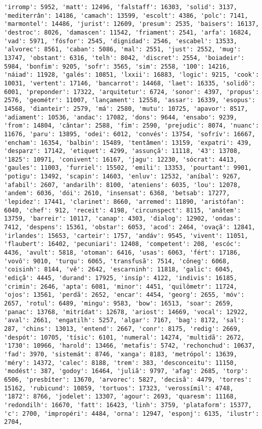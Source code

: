 \documentclass[11pt]{article}
\begin{document}
\begin{Verbatim}[commandchars=\\\{\}]
'irromp': 5952, 'matt': 12496, 'falstaff': 16303, 'solid': 3137, 'mediterrân': 14186, 'camach': 13599, 'escolt': 4386, 'polc': 7141, 'marmontel': 14486, 'jurist': 12609, 'presum': 2535, 'baisers': 16137, 'destroc': 8026, 'damascen': 11542, 'friament': 2541, 'arfa': 16824, 'vad': 5971, 'fósfor': 2545, 'dignidad': 2546, 'escabel': 13533, 'alvorec': 8561, 'caban': 5086, 'mal': 2551, 'just': 2552, 'mug': 13747, 'obstant': 6316, 'telh': 8042, 'discret': 2554, 'boiadeir': 5984, 'bonfim': 9205, 'sofr': 3565, 'sim': 2558, '100': 14216, 'náiad': 11928, 'galés': 10851, 'lxxii': 16883, 'logic': 9215, 'cook': 10031, 'vertent': 17146, 'bancarrot': 14468, 'laet': 16335, 'solidõ': 6001, 'preponder': 17322, 'arquitetur': 6724, 'sonor': 4397, 'propus': 2576, 'geométr': 11007, 'lançament': 12558, 'assar': 16339, 'esopus': 14568, 'dianteir': 2579, 'má': 2580, 'mutu': 10725, 'apavor': 8517, 'adiament': 10536, 'andac': 17082, 'dons': 9644, 'ensabo': 9239, 'from': 14804, 'cântar': 2588, 'fim': 2590, 'prejudic': 8074, 'nuanc': 11676, 'paru': 13895, 'odei': 6012, 'convés': 13754, 'sofrív': 16667, 'encham': 16354, 'balbin': 15489, 'tentâmen': 13159, 'expatri': 439, 'desparz': 17142, 'etiquet': 4299, 'assunçã': 11118, '43': 13708, '1825': 10971, 'conivent': 16167, 'jagu': 12230, 'sócrat': 4413, 'gaules': 11003, 'furriel': 15502, 'emili': 13353, 'pourtant': 9901, 'potigu': 13492, 'scapin': 14603, 'enluv': 12532, 'aníbal': 9267, 'afabil': 2607, 'andarilh': 8100, 'ateniens': 6035, 'lou': 12078, 'andem': 6036, 'dói': 2610, 'insensat': 6368, 'betsab': 17277, 'lepidez': 17441, 'clarinet': 8660, 'arremed': 11890, 'aristófan': 6040, 'chef': 912, 'receit': 4198, 'circunspect': 8115, 'anátem': 13759, 'barreir': 10117, 'canap': 4303, 'dialog': 12902, 'ondas': 7412, 'despens': 15361, 'obstar': 6053, 'acod': 2464, 'ovaçã': 12841, 'irlandes': 15653, 'carteir': 1757, 'andáv': 9545, 'vivent': 11051, 'flaubert': 16402, 'pecuniari': 12408, 'competent': 208, 'escóc': 4436, 'avult': 5818, 'otoman': 6416, 'usas': 6063, 'fért': 17186, 'vovô': 9010, 'turqu': 6065, 'transfusã': 7514, 'côneg': 6068, 'coisinh': 8144, 'vê': 2642, 'escarninh': 11818, 'galic': 6045, 'ediçã': 4445, 'durand': 17925, 'insíp': 4122, 'indivis': 16185, 'crimin': 2646, 'apta': 6081, 'minor': 4451, 'quilômetr': 11724, 'ojos': 13561, 'perdã': 2652, 'encar': 4454, 'georg': 2655, 'móv': 2657, 'rotul': 6489, 'mingu': 9583, 'bow': 16513, 'soar': 2659, 'panac': 13768, 'mitrídat': 12678, 'ariost': 14669, 'vocal': 12922, 'aval': 2661, 'engatilh': 5257, 'algar': 7167, 'bag': 8172, 'sal': 287, 'chins': 13013, 'entend': 2667, 'conr': 8175, 'redig': 2669, 'despót': 10705, 'tísic': 6101, 'numeral': 14274, 'multidã': 2672, '1730': 10966, 'harold': 13466, 'metafis': 5742, 'rechonchud': 10637, 'fad': 3970, 'sistemát': 8746, 'xanga': 8183, 'metrópol': 13639, 'méry': 14372, 'calec': 8188, 'trem': 383, 'desconceitu': 11150, 'modést': 387, 'godoy': 16464, 'juliã': 9797, 'afag': 2685, 'torp': 6506, 'presbíter': 13670, 'arvorec': 5827, 'decisã': 4479, 'torres': 15162, 'rubicund': 10859, 'tortuos': 17323, 'verossímil': 4748, '1872': 8766, 'jodelet': 13307, 'agour': 2693, 'quaresm': 11168, 'redondilh': 16670, 'fatt': 16423, 'linh': 3759, 'plataform': 15377, 'c': 2700, 'impropéri': 4484, 'orna': 12947, 'esponj': 6135, 'ilustr': 2704, 
\end{Verbatim}
\end{document}
